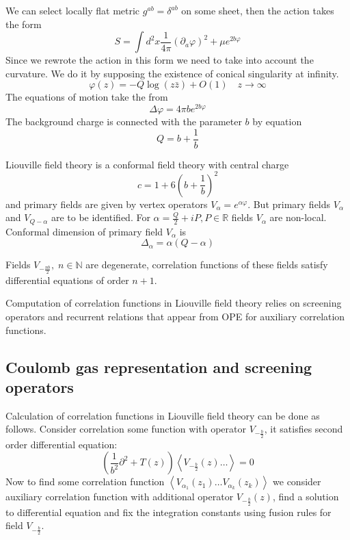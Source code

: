 \documentclass[12pt]{article}
\begin{document}
We can select locally flat metric $g^{ab}=\delta^{ab}$ on some sheet, then the action takes the form
\begin{equation}
  \label{eq:14}
  S= \int d^{2}x \frac{1}{4\pi} (\partial_{a} \varphi)^{2}+\mu e^{2b\varphi}
\end{equation}
Since we rewrote the action in this form we need to take into account the curvature. We do it by
supposing the existence of conical singularity at infinity.
\begin{equation}
  \label{eq:15}
  \varphi(z)=-Q \log (z\bar z)+O(1) \quad z\to\infty
\end{equation}
The equations of motion take the from
\begin{equation}
  \label{eq:18}
  \Delta \varphi = 4\pi b e^{2b\varphi}
\end{equation}
The background charge is connected with the parameter $b$ by equation
\begin{equation}
  \label{eq:20}
  Q=b+\frac{1}{b}
\end{equation}

Liouville field theory is a conformal field theory with central charge
\begin{equation}
  \label{eq:19}
  c=1+6\left(b+\frac{1}{b}\right)^{2}
\end{equation}
and primary fields are given by vertex operators $V_{\alpha}=e^{\alpha\varphi}$. But primary fields
$V_{\alpha}$ and $V_{Q-\alpha}$ are to be identified. For $\alpha=\frac{Q}{2}+i P, P\in \mathbb{R}$
fields $V_{\alpha}$ are non-local. Conformal dimension of primary field $V_{\alpha}$ is
\begin{equation}
  \label{eq:32}
  \Delta_{\alpha}=\alpha(Q-\alpha)
\end{equation}

Fields $V_{-\frac{nb}{2}}, \; n\in \mathbb{N}$ are degenerate, correlation functions of these fields
satisfy differential equations of order $n+1$. 

Computation of correlation functions in Liouville field theory relies on screening operators and
recurrent relations that appear from OPE for auxiliary correlation functions.
\subsection{Coulomb gas representation and screening operators}
\label{sec:coul-gas-repr}

Calculation of correlation functions in Liouville field theory can be done as follows. 
Consider correlation some function with operator $V_{-\frac{b}{2}}$, it satisfies second order
differential equation:
\begin{equation}
  \label{eq:33}
  \left(\frac{1}{b^{2}}\partial^{2}+T(z)\right)\left<V_{-\frac{b}{2}}(z) \dots \right>=0
\end{equation}
Now to find some correlation function $\left<V_{\alpha_{1}}(z_{1})\dots
  V_{\alpha_{k}}(z_{k})\right>$ we consider auxiliary correlation function with additional
operator $V_{-\frac{b}{2}}(z)$, find a solution to differential equation and fix the integration
constants using fusion rules for field $V_{-\frac{b}{2}}$.
\end{document}
